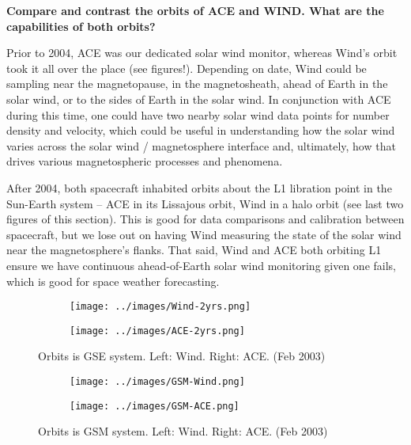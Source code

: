 \textbf{Compare and contrast the orbits of ACE and WIND. What are the capabilities of both orbits?}

Prior to 2004, ACE was our dedicated solar wind monitor, whereas Wind's
orbit took it all over the place (see figures!). Depending on date, Wind
could be sampling near the magnetopause, in the magnetosheath, ahead of
Earth in the solar wind, or to the sides of Earth in the solar wind. In
conjunction with ACE during this time, one could have two nearby solar
wind data points for number density and velocity, which could be useful
in understanding how the solar wind varies across the solar wind /
magnetosphere interface and, ultimately, how that drives various
magnetospheric processes and phenomena.

After 2004, both spacecraft inhabited orbits about the L1 libration
point in the Sun-Earth system -- ACE in its Lissajous orbit, Wind in a
halo orbit (see last two figures of this section). This is good for data
comparisons and calibration between spacecraft, but we lose out on
having Wind measuring the state of the solar wind near the
magnetosphere's flanks. That said, Wind and ACE both orbiting L1 ensure
we have continuous ahead-of-Earth solar wind monitoring given one fails,
which is good for space weather forecasting.


\begin{figure}[h]
  \centering
  \begin{subfigure}[1a]{0.4\textwidth}
    \centering
    \texttt{[image: ../images/Wind-2yrs.png]}
  \end{subfigure}
  \hfill
  \begin{subfigure}[1b]{0.4\textwidth}
    \centering
    \texttt{[image: ../images/ACE-2yrs.png]}
  \end{subfigure}
  \caption{Orbits is GSE system. Left: Wind. Right: ACE.  (Feb 2003)}
  \label{fig-GSE}
\end{figure}

\begin{figure}[h]
  \centering
  \begin{subfigure}[1a]{0.4\textwidth}
    \centering
    \texttt{[image: ../images/GSM-Wind.png]}
  \end{subfigure}
  \hfill
  \begin{subfigure}[1b]{0.4\textwidth}
    \centering
    \texttt{[image: ../images/GSM-ACE.png]}
  \end{subfigure}
  \caption{Orbits is GSM system. Left: Wind. Right: ACE.  (Feb 2003)}
  \label{fig-gsm}
\end{figure}


